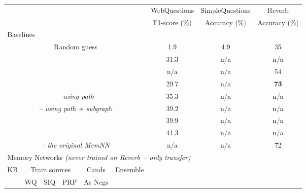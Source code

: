 \documentclass[11pt,a4paper]{article}
\newcommand{\wq}{{\sf WebQuestions}\xspace}
\newcommand{\rv}{{\sf Reverb}\xspace}
\newcommand{\fbq}{{\sf SimpleQuestions}\xspace}
\begin{document}
\begin{table*}
\begin{center}
\begin{small}
\begin{tabular}{|c|c|c|c|c|c|c|c|c|}
\cline{7-9}
\multicolumn{6}{c|}{} & \wq & \fbq & \rv \\
\multicolumn{6}{c|}{} & {\sc F1-score (\%)} & {\sc Accuracy (\%)} &
                                                                    {\sc
                                                                    Accuracy
                                                                    (\%)}
  \\
\hline
\multicolumn{9}{|l|}{{\sc Baselines}} \\
\hline
\multicolumn{6}{|c|}{ Random guess} & 1.9 & 4.9 & 35 \\
\multicolumn{6}{|c|}{\cite{berant-EtAl:2013:EMNLP}} & 31.3 & n/a & n/a \\
\multicolumn{6}{|c|}{\cite{fader2014open}} & n/a  & n/a & 54 \\
\multicolumn{6}{|c|}{\cite{bordes2014open}} & 29.7  & n/a & {\bf 73}
  \\
\multicolumn{6}{|c|}{\cite{bordes-chopra-weston:2014:EMNLP2014} -- {\it
  using path}} &
                                                                   35.3
                                   & n/a &  n/a \\
\multicolumn{6}{|c|}{\cite{bordes-chopra-weston:2014:EMNLP2014} -- {\it
  using path + subgraph}} &
                                                                   39.2
                                   & n/a &  n/a \\
\multicolumn{6}{|c|}{\cite{berant2014semantic}} & 39.9 & n/a & n/a \\
\multicolumn{6}{|c|}{\cite{yang2014joint}} & 41.3 & n/a & n/a \\
\multicolumn{6}{|c|}{\cite{weston2014memory}  -- {\it the original MemNN}} & n/a & n/a & 72 \\

\hline
\multicolumn{9}{|l|}{{\sc Memory Networks} {\it (never trained on \rv~--
  only transfer)}} \\
\hline
{\sc KB} & \multicolumn{3}{|c|}{\sc Train sources} &
                                           {\sc Cands} & {\sc Ensemble} &
                                                                    \multicolumn{3}{|c|}{}\\
& {\sf WQ} & {\sf SIQ} & {\sf PRP} &  {\sc As Negs} & & \multicolumn{3}{|c|}{}\\


\end{tabular}
\end{small}
\end{center}
\end{table*}
\end{document}
